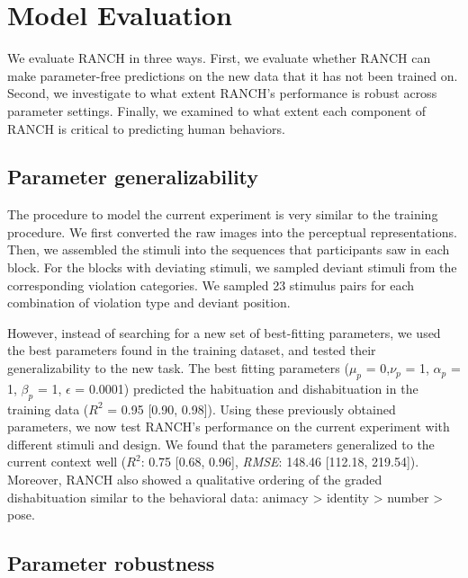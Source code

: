 \documentclass[10pt, letterpaper]{article}
\begin{document}
\hypertarget{model-evaluation}{%
\section{Model Evaluation}\label{model-evaluation}}

We evaluate RANCH in three ways. First, we evaluate whether RANCH can
make parameter-free predictions on the new data that it has not been
trained on. Second, we investigate to what extent RANCH's performance is
robust across parameter settings. Finally, we examined to what extent
each component of RANCH is critical to predicting human behaviors.

\hypertarget{parameter-generalizability}{%
\subsection{Parameter
generalizability}\label{parameter-generalizability}}

The procedure to model the current experiment is very similar to the
training procedure. We first converted the raw images into the
perceptual representations. Then, we assembled the stimuli into the
sequences that participants saw in each block. For the blocks with
deviating stimuli, we sampled deviant stimuli from the corresponding
violation categories. We sampled 23 stimulus pairs for each combination
of violation type and deviant position.

However, instead of searching for a new set of best-fitting parameters,
we used the best parameters found in the training dataset, and tested
their generalizability to the new task. The best fitting parameters
(\(\mu_{p}\) = 0,\(\nu_{p}\) = 1, \(\alpha_{p}\) = 1, \(\beta_{p}\) = 1,
\(\epsilon\) = 0.0001) predicted the habituation and dishabituation in
the training data (\(R^2\) = 0.95 {[}0.90, 0.98{]}). Using these
previously obtained parameters, we now test RANCH's performance on the
current experiment with different stimuli and design. We found that the
parameters generalized to the current context well (\(R^2\): 0.75
{[}0.68, 0.96{]}, \emph{RMSE}: 148.46 {[}112.18, 219.54{]}). Moreover,
RANCH also showed a qualitative ordering of the graded dishabituation
similar to the behavioral data: animacy \textgreater{} identity
\textgreater{} number \textgreater{} pose.

\hypertarget{parameter-robustness}{%
\subsection{Parameter robustness}\label{parameter-robustness}}
\end{document}
